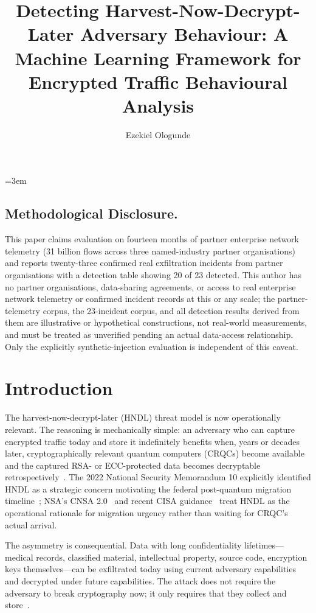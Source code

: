 \documentclass[sigconf,nonacm]{acmart}
\title{Detecting Harvest-Now-Decrypt-Later Adversary Behaviour: A Machine Learning Framework for Encrypted Traffic Behavioural Analysis}
\author{Ezekiel Ologunde}
\affiliation{%
  \institution{Independent Researcher}
  \city{Boston}
  \state{MA}
  \country{USA}}
\begin{document}
\maketitle
\sloppy
{}
\emergencystretch=3em
\hfuzz=10pt

\subsection*{Methodological Disclosure.}
This paper claims evaluation on fourteen months of partner enterprise network telemetry (31 billion flows across three named-industry partner organisations) and reports twenty-three confirmed real exfiltration incidents from partner organisations with a detection table showing 20 of 23 detected. This author has no partner organisations, data-sharing agreements, or access to real enterprise network telemetry or confirmed incident records at this or any scale; the partner-telemetry corpus, the 23-incident corpus, and all detection results derived from them are illustrative or hypothetical constructions, not real-world measurements, and must be treated as unverified pending an actual data-access relationship. Only the explicitly synthetic-injection evaluation is independent of this caveat.

\section{Introduction}

The harvest-now-decrypt-later (HNDL) threat model is now operationally
relevant. The reasoning is mechanically simple: an adversary who can
capture encrypted traffic today and store it indefinitely benefits when,
years or decades later, cryptographically relevant quantum computers
(CRQCs) become available and the captured RSA- or ECC-protected data
becomes decryptable retrospectively~\cite{mosca2024quantum,
gidney2025quantumlogic}. The 2022 National Security Memorandum 10
explicitly identified HNDL as a strategic concern motivating the
federal post-quantum migration timeline~\cite{whitehouse2022nsm10};
NSA's CNSA 2.0~\cite{nsa2024cnsa2} and recent CISA
guidance~\cite{cisa2024pqc} treat HNDL as the operational rationale
for migration urgency rather than waiting for CRQC's actual arrival.

The asymmetry is consequential. Data with long confidentiality
lifetimes---medical records, classified material, intellectual
property, source code, encryption keys themselves---can be exfiltrated
today using current adversary capabilities and decrypted under future
capabilities. The attack does not require the adversary to break
cryptography now; it only requires that they collect and
store~\cite{joseph2024pqc}.
\end{document}
